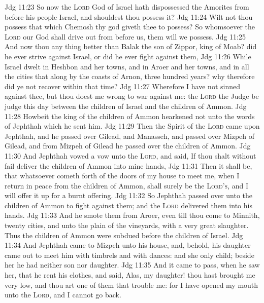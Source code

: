 \vs Jdg 11:23 So now the \textsc{Lord} God of Israel hath dispossessed the Amorites from before his people Israel, and shouldest thou possess it?
\vs Jdg 11:24 Wilt not thou possess that which Chemosh thy god giveth thee to possess? So whomsoever the \textsc{Lord} our God shall drive out from before us, them will we possess.
\vs Jdg 11:25 And now  thou any thing better than Balak the son of Zippor, king of Moab? did he ever strive against Israel, or did he ever fight against them,
\vs Jdg 11:26 While Israel dwelt in Heshbon and her towns, and in Aroer and her towns, and in all the cities that  along by the coasts of Arnon, three hundred years? why therefore did ye not recover  within that time?
\vs Jdg 11:27 Wherefore I have not sinned against thee, but thou doest me wrong to war against me: the \textsc{Lord} the Judge be judge this day between the children of Israel and the children of Ammon.
\vs Jdg 11:28 Howbeit the king of the children of Ammon hearkened not unto the words of Jephthah which he sent him.
\vs Jdg 11:29 Then the Spirit of the \textsc{Lord} came upon Jephthah, and he passed over Gilead, and Manasseh, and passed over Mizpeh of Gilead, and from Mizpeh of Gilead he passed over  the children of Ammon.
\vs Jdg 11:30 And Jephthah vowed a vow unto the \textsc{Lord}, and said, If thou shalt without fail deliver the children of Ammon into mine hands,
\vs Jdg 11:31 Then it shall be, that whatsoever cometh forth of the doors of my house to meet me, when I return in peace from the children of Ammon, shall surely be the \textsc{Lord's}, and I will offer it up for a burnt offering.
\vs Jdg 11:32 So Jephthah passed over unto the children of Ammon to fight against them; and the \textsc{Lord} delivered them into his hands.
\vs Jdg 11:33 And he smote them from Aroer, even till thou come to Minnith,  twenty cities, and unto the plain of the vineyards, with a very great slaughter. Thus the children of Ammon were subdued before the children of Israel.
\vs Jdg 11:34 And Jephthah came to Mizpeh unto his house, and, behold, his daughter came out to meet him with timbrels and with dances: and she  only child; beside her he had neither son nor daughter.
\vs Jdg 11:35 And it came to pass, when he saw her, that he rent his clothes, and said, Alas, my daughter! thou hast brought me very low, and thou art one of them that trouble me: for I have opened my mouth unto the \textsc{Lord}, and I cannot go back.
